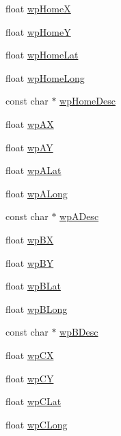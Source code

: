 \begin{DoxyCompactItemize}
\item 
float \hyperlink{group___aero_sim_r_c_gac7fe47d860d72f33b075d84a1794f039}{wp\-Home\-X}
\item 
float \hyperlink{group___aero_sim_r_c_ga943c9583ab5e36a5c4b4eb92b34c3aa2}{wp\-Home\-Y}
\item 
float \hyperlink{group___aero_sim_r_c_ga5364e2cce6429762b9597145fc144130}{wp\-Home\-Lat}
\item 
float \hyperlink{group___aero_sim_r_c_ga1a595cb81efdafe9ec21ef40211ad74e}{wp\-Home\-Long}
\item 
const char $\ast$ \hyperlink{group___aero_sim_r_c_ga8662d58603fa2a33c7959677b0ec7783}{wp\-Home\-Desc}
\item 
float \hyperlink{group___aero_sim_r_c_gaeee88b74290e9df5d3c70d111c9375cc}{wp\-A\-X}
\item 
float \hyperlink{group___aero_sim_r_c_gaf5e140b64d5e9eae533fd3c0195c0fa8}{wp\-A\-Y}
\item 
float \hyperlink{group___aero_sim_r_c_ga1eb50174e2e2f438f0b1aef4dca0744f}{wp\-A\-Lat}
\item 
float \hyperlink{group___aero_sim_r_c_gacda15282e441109ecba7a4709e9b8a0c}{wp\-A\-Long}
\item 
const char $\ast$ \hyperlink{group___aero_sim_r_c_ga527aaa5fbbb0b3108b4ccace20e252d2}{wp\-A\-Desc}
\item 
float \hyperlink{group___aero_sim_r_c_gaf7735ebc4b357abc63f8b409da005e65}{wp\-B\-X}
\item 
float \hyperlink{group___aero_sim_r_c_ga940744eca5513d5b45725bad868231e5}{wp\-B\-Y}
\item 
float \hyperlink{group___aero_sim_r_c_gad362dcc92c44981f1062410b4d0105d8}{wp\-B\-Lat}
\item 
float \hyperlink{group___aero_sim_r_c_ga00083d7085ddb6c0cd1b432f5338d7d5}{wp\-B\-Long}
\item 
const char $\ast$ \hyperlink{group___aero_sim_r_c_ga847521c9c396ca010d434dde9d9c33ee}{wp\-B\-Desc}
\item 
float \hyperlink{group___aero_sim_r_c_ga0a8e805aa99027c87923b25db32173ab}{wp\-C\-X}
\item 
float \hyperlink{group___aero_sim_r_c_ga3dd39df83926569f9d180ced28377a4f}{wp\-C\-Y}
\item 
float \hyperlink{group___aero_sim_r_c_ga478358c452d4087d066f487fab4f0fe4}{wp\-C\-Lat}
\item 
float \hyperlink{group___aero_sim_r_c_gafe8c244799a4b6767955285ea1ab4ed9}{wp\-C\-Long}
\item 

\end{DoxyCompactItemize}
